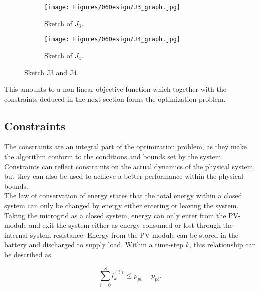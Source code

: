 \begin{figure}
    \begin{subfigure}{\textwidth}
    \centering
    \texttt{[image: Figures/06Design/J3\_graph.jpg]}
    \caption{Sketch of $J_3$.}
    \label{fig:J3_graph}
  \end{subfigure}

  \vspace{0.5cm}

  \begin{subfigure}{\textwidth}
    \centering
    \texttt{[image: Figures/06Design/J4\_graph.jpg]}
    \caption{Sketch of $J_4$.}
    \label{fig:J4_graph}
  \end{subfigure}

  \caption[Sketch J3 and J4]{Sketch J3 and J4.}
  \label{fig:sketchJ3&J4}
\end{figure}

This amounts to a non-linear objective function which together with the constraints deduced in the next section forms the optimization problem.

\subsection{Constraints}

The constraints are an integral part of the optimization problem, as they make the algorithm conform to the conditions and bounds set by the system. Constraints can reflect constraints on the actual dynamics of the physical system, but they can also be used to achieve a better performance within the physical bounds.\\

The law of conservation of energy states that the total energy within a closed system can only be changed by energy either entering or leaving the system. Taking the microgrid as a closed system, energy can only enter from the PV-module and exit the system either as energy consumed or lost through the internal system resistance. Energy from the PV-module can be stored in the battery and discharged to supply load. Within a time-step $k$, this relationship can be described as 

\begin{equation}
    \sum_{i=0}^S l_k^{(i)} \leq p_{pv} - p_{pb}.
    \label{eq:energy_balance}
\end{equation}

